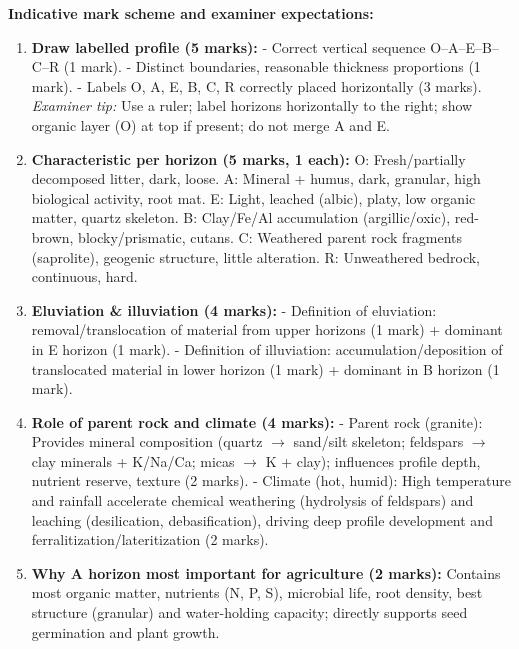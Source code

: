 \documentclass[11pt]{article}
\begin{document}
\begin{corrige}
\textbf{Indicative mark scheme and examiner expectations:}
\begin{enumerate}
\item \textbf{Draw labelled profile (5 marks):}  
  - Correct vertical sequence O–A–E–B–C–R (1 mark).  
  - Distinct boundaries, reasonable thickness proportions (1 mark).  
  - Labels O, A, E, B, C, R correctly placed horizontally (3 marks).  
  \textit{Examiner tip:} Use a ruler; label horizons horizontally to the right; show organic layer (O) at top if present; do not merge A and E.

\item \textbf{Characteristic per horizon (5 marks, 1 each):}  
  O: Fresh/partially decomposed litter, dark, loose.  
  A: Mineral + humus, dark, granular, high biological activity, root mat.  
  E: Light, leached (albic), platy, low organic matter, quartz skeleton.  
  B: Clay/Fe/Al accumulation (argillic/oxic), red-brown, blocky/prismatic, cutans.  
  C: Weathered parent rock fragments (saprolite), geogenic structure, little alteration.  
  R: Unweathered bedrock, continuous, hard.

\item \textbf{Eluviation \& illuviation (4 marks):}  
  - Definition of eluviation: removal/translocation of material from upper horizons (1 mark) + dominant in E horizon (1 mark).  
  - Definition of illuviation: accumulation/deposition of translocated material in lower horizon (1 mark) + dominant in B horizon (1 mark).

\item \textbf{Role of parent rock and climate (4 marks):}  
  - Parent rock (granite): Provides mineral composition (quartz $\to$ sand/silt skeleton; feldspars $\to$ clay minerals + K/Na/Ca; micas $\to$ K + clay); influences profile depth, nutrient reserve, texture (2 marks).  
  - Climate (hot, humid): High temperature and rainfall accelerate chemical weathering (hydrolysis of feldspars) and leaching (desilication, debasification), driving deep profile development and ferralitization/lateritization (2 marks).

\item \textbf{Why A horizon most important for agriculture (2 marks):}  
  Contains most organic matter, nutrients (N, P, S), microbial life, root density, best structure (granular) and water-holding capacity; directly supports seed germination and plant growth.
\end{enumerate}
\end{corrige}
\end{document}
